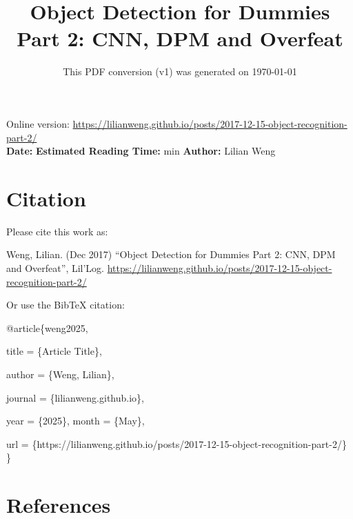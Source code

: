 \documentclass[12pt]{article}
\title{Object Detection for Dummies Part 2: CNN, DPM and Overfeat}
\date{This PDF conversion (v1) was generated on \today\footnotemark}
\begin{document}
\maketitle
\begin{center}
    Online version: \url{https://lilianweng.github.io/posts/2017-12-15-object-recognition-part-2/} \\
    \textbf{Date:} \quad
    \textbf{Estimated Reading Time:}  min \quad
    \textbf{Author:} Lilian Weng
\end{center}




\newpage
\tableofcontents
\newpage
\vspace{1em}
\n\n\n\section{Citation}
Please cite this work as:

\begin{tcolorbox}[colback=black!5!white, colframe=black!80!white, boxrule=0.5pt, arc=2mm, left=1mm, right=1mm, top=1mm, bottom=1mm]
  Weng, Lilian. (Dec 2017) ``Object Detection for Dummies Part 2: CNN, DPM and Overfeat'', Lil'Log. \url{https://lilianweng.github.io/posts/2017-12-15-object-recognition-part-2/}
  \end{tcolorbox}

Or use the BibTeX citation:

\begin{tcolorbox}[
    colback=black!5!white,
    colframe=black!80!white,
    boxrule=0.5pt,
    arc=2mm,
    left=1mm,
    right=1mm,
    top=1mm,
    bottom=1mm,
    listing only,
    listing options={
      basicstyle=\ttfamily\footnotesize,
      breaklines=true,
      literate={\{}{{\char`\{}}1 {\}}{{\char`\}}}1
    }
  ]
  @article\{weng2025,

    title   = \{Article Title\},

    author  = \{Weng, Lilian\},

    journal = \{lilianweng.github.io\},

    year    = \{2025\},
    month   = \{May\},

    url     = \{https://lilianweng.github.io/posts/2017-12-15-object-recognition-part-2/\}\n
  \}
  \end{tcolorbox}

\newpage
\section{References}

\n
\end{document}
